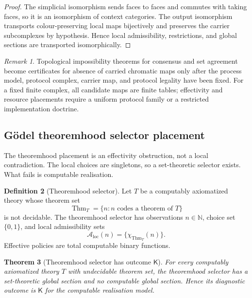 \documentclass[11pt]{article}
\theoremstyle{plain}
\newtheorem{theorem}{Theorem}[section]
\theoremstyle{definition}
\newtheorem{definition}[theorem]{Definition}
\theoremstyle{remark}
\newtheorem{remark}[theorem]{Remark}
\newcommand{\N}{\mathbb{N}}
\newcommand{\LocalAdm}{\mathcal{A}_{\mathrm{loc}}}
\begin{document}
\begin{proof}
The simplicial isomorphism sends faces to faces and commutes with taking faces,
so it is an isomorphism of context categories. The output isomorphism transports
colour-preserving local maps bijectively and preserves the carrier subcomplexes
by hypothesis. Hence local admissibility, restrictions, and global sections are
transported isomorphically.
\end{proof}

\begin{remark}
Topological impossibility theorems for consensus and set agreement become
certificates for absence of carried chromatic maps only after the process model,
protocol complex, carrier map, and protocol legality have been fixed. For a
fixed finite complex, all candidate maps are finite tables; effectivity and
resource placements require a uniform protocol family or a restricted
implementation doctrine.
\end{remark}

\subsection{Gödel theoremhood selector placement}
\label{subsec:godel-theoremhood-placement}

The theoremhood placement is an effectivity obstruction, not a local
contradiction. The local choices are singletons, so a set-theoretic selector
exists. What fails is computable realisation.

\begin{definition}[Theoremhood selector]
\label{def:theoremhood-selector}
Let $T$ be a computably axiomatized theory whose theorem set
\[
\operatorname{Thm}_T=\{n:n\text{ codes a theorem of }T\}
\]
is not decidable. The theoremhood selector has observations $n\in\N$, choice set
$\{0,1\}$, and local admissibility sets
\[
\LocalAdm(n)=\{\chi_{\operatorname{Thm}_T}(n)\}.
\]
Effective policies are total computable binary functions.
\end{definition}

\begin{theorem}[Theoremhood selector has outcome $\mathsf K$]
\label{thm:theoremhood-selector-K}
For every computably axiomatized theory $T$ with undecidable theorem set, the
theoremhood selector has a set-theoretic global section and no computable global
section. Hence its diagnostic outcome is $\mathsf K$ for the computable
realisation model.
\end{theorem}
\end{document}
